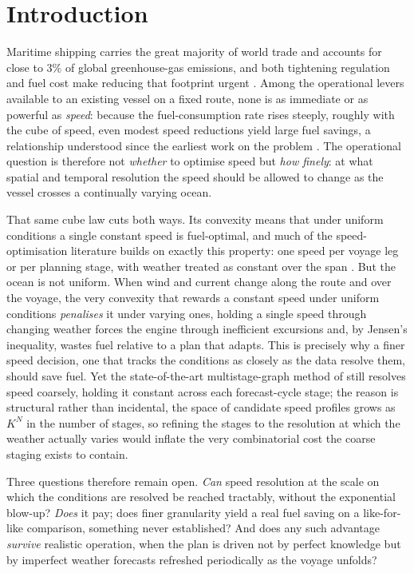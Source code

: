 \documentclass[review,authoryear]{elsarticle}
\begin{document}
\section{Introduction}
\label{sec:intro}
Maritime shipping carries the great majority of world trade and accounts for close to 3\% of global
greenhouse-gas emissions, and both tightening regulation and fuel cost make reducing that footprint
urgent \citep{IMO2023, Bouman2017}. Among the operational levers available to an existing vessel on a
fixed route, none is as immediate or as powerful as \emph{speed}: because the fuel-consumption rate
rises steeply, roughly with the cube of speed, even modest speed reductions yield large fuel
savings, a relationship understood since the earliest work on the problem \citep{Ronen2011,
Psaraftis2013}. The operational question is therefore not \emph{whether} to optimise speed but
\emph{how finely}: at what spatial and temporal resolution the speed should be allowed to change as the
vessel crosses a continually varying ocean.

That same cube law cuts both ways. Its convexity means that under uniform conditions a single constant
speed is fuel-optimal, and much of the speed-optimisation literature builds on exactly this property:
one speed per voyage leg or per planning stage, with weather treated as constant over the span
\citep{Norstad2011, Hvattum2013}. But the ocean is not uniform. When wind and current change
along the route and over the voyage, the very convexity that rewards a constant speed under uniform
conditions \emph{penalises} it under varying ones, holding a single speed through changing weather
forces the engine through inefficient excursions and, by Jensen's inequality, wastes fuel relative to a
plan that adapts. This is precisely why a finer speed decision, one that tracks the conditions as closely as the data
resolve them, should save fuel. Yet the state-of-the-art multistage-graph method of \citet{luo2024} still
resolves speed coarsely, holding it constant across each forecast-cycle stage; the reason is structural
rather than incidental, the space of candidate speed profiles grows as $K^{N}$ in the number of
stages, so refining the stages to the resolution at which the weather actually varies would inflate the
very combinatorial cost the coarse staging exists to contain.

Three questions therefore remain open. \emph{Can} speed resolution at the scale on which the
conditions are resolved be reached tractably,
without the exponential blow-up? \emph{Does} it pay; does finer granularity yield a real fuel
saving on a like-for-like comparison, something never established? And does any such advantage
\emph{survive} realistic operation, when the plan is driven not by perfect knowledge but by imperfect
weather forecasts refreshed periodically as the voyage unfolds?
\end{document}
